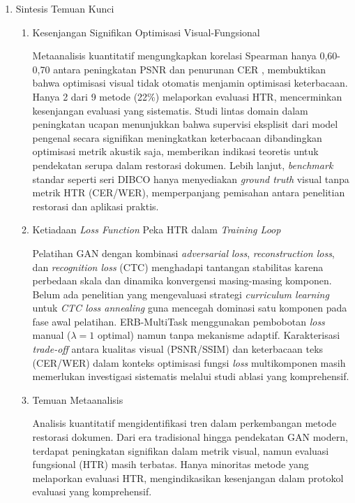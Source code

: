 \begin{enumerate}[leftmargin=*, labelindent=0pt, itemsep=1ex, topsep=0pt]

\item Sintesis Temuan Kunci

\begin{enumerate}[leftmargin=1.5em, labelsep=0.5em, itemindent=0pt, label=\alph*., topsep=0pt, parsep=0pt, itemsep=0pt]
      \item Kesenjangan Signifikan Optimisasi Visual-Fungsional

            Metaanalisis kuantitatif mengungkapkan korelasi Spearman hanya 0,60-0,70 antara peningkatan PSNR dan penurunan CER \parencite{jadhav2022}, membuktikan bahwa optimisasi visual tidak otomatis menjamin optimisasi keterbacaan. Hanya 2 dari 9 metode (22\%) melaporkan evaluasi HTR, mencerminkan kesenjangan evaluasi yang sistematis. Studi lintas domain dalam peningkatan ucapan \parencite{weninger2023} menunjukkan bahwa supervisi eksplisit dari model pengenal secara signifikan meningkatkan keterbacaan dibandingkan optimisasi metrik akustik saja, memberikan indikasi teoretis untuk pendekatan serupa dalam restorasi dokumen. Lebih lanjut, \textit{benchmark} standar seperti seri DIBCO hanya menyediakan \textit{ground truth} visual tanpa metrik HTR (CER/WER), memperpanjang pemisahan antara penelitian restorasi dan aplikasi praktis.

      \item Ketiadaan \textit{Loss Function} Peka HTR dalam \textit{Training Loop}


            Pelatihan GAN dengan kombinasi \textit{adversarial loss}, \textit{reconstruction loss}, dan \textit{recognition loss} (CTC) menghadapi tantangan stabilitas karena perbedaan skala dan dinamika konvergensi masing-masing komponen. Belum ada penelitian yang mengevaluasi strategi \textit{curriculum learning} untuk \textit{CTC loss annealing} guna mencegah dominasi satu komponen pada fase awal pelatihan. ERB-MultiTask menggunakan pembobotan \textit{loss} manual ($\lambda=1$ optimal) namun tanpa mekanisme adaptif. Karakterisasi \textit{trade-off} antara kualitas visual (PSNR/SSIM) dan keterbacaan teks (CER/WER) dalam konteks optimisasi fungsi \textit{loss} multikomponen masih memerlukan investigasi sistematis melalui studi ablasi yang komprehensif.

      \item Temuan Metaanalisis

            Analisis kuantitatif mengidentifikasi tren dalam perkembangan metode restorasi dokumen. Dari era tradisional hingga pendekatan GAN modern, terdapat peningkatan signifikan dalam metrik visual, namun evaluasi fungsional (HTR) masih terbatas. Hanya minoritas metode yang melaporkan evaluasi HTR, mengindikasikan kesenjangan dalam protokol evaluasi yang komprehensif.
\end{enumerate}


\end{enumerate}
